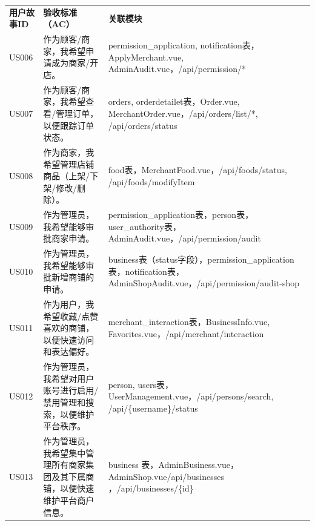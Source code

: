 \begin{levellist}
\begin{levellist}
\begin{longtable}{>{\centering\arraybackslash}m{2.3cm} >{\centering\arraybackslash}m{4.5cm} >{\centering\arraybackslash}m{7cm}}
            \multicolumn{3}{c}{{\tablename\ \thetable{} 续表}}                                                                                                                     \\
            \toprule
            \textbf{用户故事ID} & \textbf{验收标准（AC）}                       & \textbf{关联模块}                                                                                            \\
            \midrule
            \endhead

            \bottomrule
            \endfoot

            US006           & 作为顾客/商家，我希望申请成为商家/开店。                   & permission\_application, notification表，ApplyMerchant.vue, AdminAudit.vue，/api/permission/*               \\
            US007           & 作为顾客/商家，我希望查看/管理订单，以便跟踪订单状态。            & orders, orderdetailet表，Order.vue, MerchantOrder.vue，/api/orders/list/*, /api/orders/status               \\
            US008           & 作为商家，我希望管理店铺商品（上架/下架/修改/删除）。            & food表，MerchantFood.vue，/api/foods/status, /api/foods/modifyItem                                          \\
            US009           & 作为管理员，我希望能够审批商家申请。                      & permission\_application表，person表，user\_authority表，AdminAudit.vue，/api/permission/audit                   \\
            US010           & 作为管理员，我希望能够审批新增商铺的申请。                   & business表（status字段），permission\_application表，notification表，AdminShopAudit.vue，/api/permission/audit-shop \\
            US011           & 作为用户，我希望收藏/点赞喜欢的商铺，以便快速访问和表达偏好。         & merchant\_interaction表，BusinessInfo.vue, Favorites.vue，/api/merchant/interaction                         \\
            US012           & 作为管理员，我希望对用户账号进行启用/禁用管理和搜索，以便维护平台秩序。    & person, users表，UserManagement.vue，/api/persons/search, /api/\{username\}/status                          \\
            US013           & 作为管理员，我希望集中管理所有商家集团及其下属商铺，以便快速维护平台商户信息。 & business 表，AdminBusiness.vue，AdminShop.vue/api/businesses ，/api/businesses/\{id\}                        \\
        \end{longtable}


\end{levellist}
\end{levellist}
